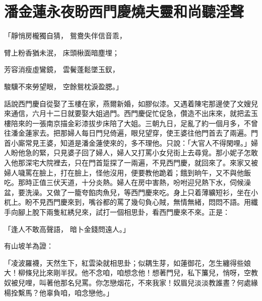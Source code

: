 %

\chapter{潘金蓮永夜盼西門慶\KG 燒夫靈和尚聽淫聲}

「靜悄房櫳獨自猜，  鴛鴦失伴信音乖，

臂上粉香猶未泯，  床頭楸面暗塵埋；

芳容消瘦虛鸞鏡，  雲鬢蓬鬆墜玉釵，

駿驥不來勞望眼，  空餘鴛枕淚盈腮。」

話說西門慶自從娶了玉樓在家，燕爾新婚，如膠似漆。又遇着陳宅那邊使了文嫂兒來通信，六月十二日就要娶大姐過門。西門慶促忙促急，儹造不出床來，就把孟玉樓陪來的一張南京描金彩漆拔步床陪了大姐。三朝九日，足亂了約一個月多，不曾往潘金蓮家去。把那婦人每日門兒倚遍，眼兒望穿，使王婆往他門首去了兩遍。門首小廝常見王婆，知道是潘金蓮使來的，多不理他。只說：「大官人不得閑哩。」婦人盼他急的緊，只見婆子回了婦人，婦人又打罵小女兒街上去尋覓。那小妮子怎敢入他那深宅大院裡去，只在門首踅探了一兩遍，不見西門慶，就回來了。來家又被婦人噦罵在臉上，打在臉上，怪他沒用，便要教他跪着；餓到晌午，又不與他飯吃。那時正值三伏天道，十分炎熱。婦人在房中害熱，吩咐迎兒熱下水，伺候澡盆，要洗澡。又做了一籠夸餡肉魚兒，等西門慶來吃。身上只着薄纊短衫，坐在小杌上。盼不見西門慶來到，嘴谷都的罵了幾句負心賊，無情無緒，悶悶不語。用纖手向腳上脫下兩隻紅綉兒來，試打一個相思卦，看西門慶來不來。正是：

「逢人不敢高聲語，  暗卜金錢問遠人。」

有山坡羊為證：

「凌波羅襪，天然生下，紅雲染就相思卦；似耦生芽，如蓮御花，怎生纏得些娘大！柳條兒比來剛半扠。他不念咱，咱想念他！想著門兒，私下簾兒，悄呀，空教奴被兒哩，叫著他那名兒罵。你怎戀烟花，不來我家！奴眉兒淡淡教誰晝？何處緣楊拴繫馬？他辜負咱，咱念戀他。」

